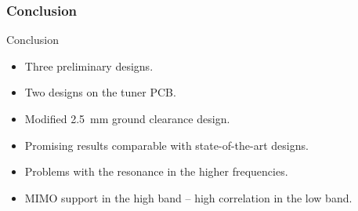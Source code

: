 \begin{frame}
  \frametitle{Conclusion}
    \begin{block}{Conclusion}
      \begin{itemize}
      \item Three preliminary designs.
      \item Two designs on the tuner PCB.
      \item Modified \SI{2.5}{mm} ground clearance design.
    \item Promising results comparable with state-of-the-art designs.
    \item Problems with the resonance in the higher frequencies.
    \item MIMO support in the high band -- high correlation in the low band.
      \end{itemize}
    \end{block}
\end{frame}

